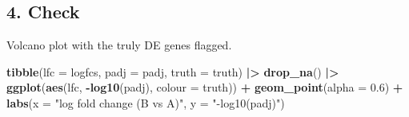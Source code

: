 \documentclass[
]{article}
\newenvironment{Shaded}{\begin{snugshade}}{\end{snugshade}}
\newcommand{\AttributeTok}[1]{\textcolor[rgb]{0.13,0.29,0.53}{#1}}
\newcommand{\ConstantTok}[1]{\textcolor[rgb]{0.56,0.35,0.01}{#1}}
\newcommand{\ControlFlowTok}[1]{\textcolor[rgb]{0.13,0.29,0.53}{\textbf{#1}}}
\newcommand{\DecValTok}[1]{\textcolor[rgb]{0.00,0.00,0.81}{#1}}
\newcommand{\FloatTok}[1]{\textcolor[rgb]{0.00,0.00,0.81}{#1}}
\newcommand{\FunctionTok}[1]{\textcolor[rgb]{0.13,0.29,0.53}{\textbf{#1}}}
\newcommand{\NormalTok}[1]{#1}
\newcommand{\OtherTok}[1]{\textcolor[rgb]{0.56,0.35,0.01}{#1}}
\newcommand{\SpecialCharTok}[1]{\textcolor[rgb]{0.81,0.36,0.00}{\textbf{#1}}}
\newcommand{\StringTok}[1]{\textcolor[rgb]{0.31,0.60,0.02}{#1}}
\begin{document}
\begin{Shaded}
\end{Shaded}

\subsection{4. Check}\label{check}

Volcano plot with the truly DE genes flagged.

\begin{Shaded}
\begin{Highlighting}[]
\FunctionTok{tibble}\NormalTok{(}\AttributeTok{lfc =}\NormalTok{ logfcs, }\AttributeTok{padj =}\NormalTok{ padj, }\AttributeTok{truth =}\NormalTok{ truth) }\SpecialCharTok{|\textgreater{}}
  \FunctionTok{drop\_na}\NormalTok{() }\SpecialCharTok{|\textgreater{}}
  \FunctionTok{ggplot}\NormalTok{(}\FunctionTok{aes}\NormalTok{(lfc, }\SpecialCharTok{{-}}\FunctionTok{log10}\NormalTok{(padj), }\AttributeTok{colour =}\NormalTok{ truth)) }\SpecialCharTok{+}
  \FunctionTok{geom\_point}\NormalTok{(}\AttributeTok{alpha =} \FloatTok{0.6}\NormalTok{) }\SpecialCharTok{+}
  \FunctionTok{labs}\NormalTok{(}\AttributeTok{x =} \StringTok{"log fold change (B vs A)"}\NormalTok{, }\AttributeTok{y =} \StringTok{"{-}log10(padj)"}\NormalTok{)}
\end{Highlighting}
\end{Shaded}
\end{document}
